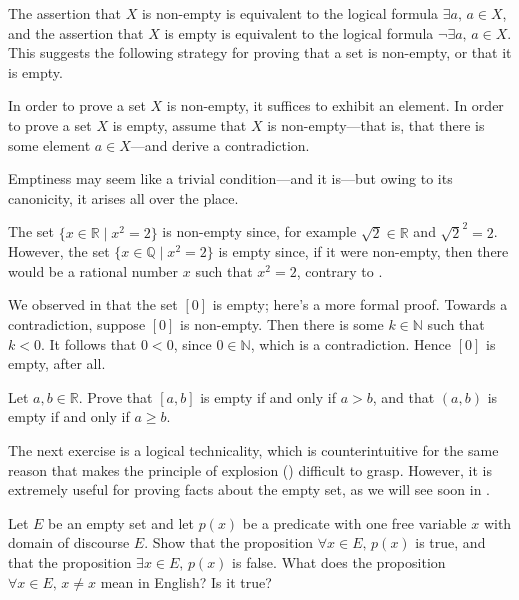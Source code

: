 The assertion that $X$ is non-empty is equivalent to the logical formula $\exists a,\, a \in X$, and the assertion that $X$ is empty is equivalent to the logical formula $\neg \exists a,\, a \in X$. This suggests the following strategy for proving that a set is non-empty, or that it is empty.

\begin{strategy}
In order to prove a set $X$ is non-empty, it suffices to exhibit an element. In order to prove a set $X$ is empty, assume that $X$ is non-empty---that is, that there is some element $a \in X$---and derive a contradiction.
\end{strategy}

Emptiness may seem like a trivial condition---and it is---but owing to its canonicity, it arises all over the place.

\begin{example}
The set $\{ x \in \mathbb{R} \mid x^2 = 2 \}$ is non-empty since, for example $\sqrt{2} \in \mathbb{R}$ and $\sqrt{2}^2 = 2$. However, the set $\{ x \in \mathbb{Q} \mid x^2 = 2 \}$ is empty since, if it were non-empty, then there would be a rational number $x$ such that $x^2 = 2$, contrary to .
\end{example}

\begin{example}
We observed in  that the set $[0]$ is empty; here's a more formal proof. Towards a contradiction, suppose $[0]$ is non-empty. Then there is some $k \in \mathbb{N}$ such that $k < 0$. It follows that $0 < 0$, since $0 \in \mathbb{N}$, which is a contradiction. Hence $[0]$ is empty, after all.
\end{example}

\begin{exercise}
Let $a,b \in \mathbb{R}$. Prove that $[a,b]$ is empty if and only if $a > b$, and that $(a,b)$ is empty if and only if $a \ge b$.
\end{exercise}

The next exercise is a logical technicality, which is counterintuitive for the same reason that makes the principle of explosion () difficult to grasp. However, it is extremely useful for proving facts about the empty set, as we will see soon in .

\begin{exercise}
Let $E$ be an empty set and let $p(x)$ be a predicate with one free variable $x$ with domain of discourse $E$. Show that the proposition $\forall x \in E,\, p(x)$ is true, and that the proposition $\exists x \in E,\, p(x)$ is false. What does the proposition $\forall x \in E,\, x \ne x$ mean in English? Is it true?
\end{exercise}

